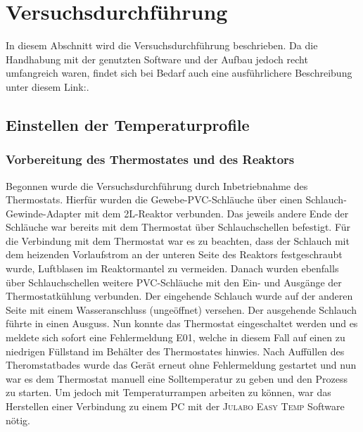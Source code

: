 \section{Versuchsdurchführung}
\label{sec:durchfuerung}
In diesem Abschnitt wird die Versuchsdurchführung beschrieben. Da die Handhabung mit der genutzten Software und der Aufbau jedoch recht umfangreich waren, findet sich bei Bedarf auch eine ausführlichere Beschreibung unter diesem Link:.
\subsection{Einstellen der Temperaturprofile}
\subsubsection*{Vorbereitung des Thermostates und des Reaktors}
Begonnen wurde die Versuchsdurchführung durch Inbetriebnahme des Thermostats. Hierfür wurden die Gewebe-PVC-Schläuche über einen Schlauch-Gewinde-Adapter mit dem 2L-Reaktor verbunden. Das jeweils andere Ende der Schläuche war bereits mit dem Thermostat über Schlauchschellen befestigt. Für die Verbindung mit dem Thermostat war es zu beachten, dass der Schlauch mit dem heizenden Vorlaufstrom an der unteren Seite des Reaktors festgeschraubt wurde, Luftblasen im Reaktormantel zu vermeiden. Danach wurden ebenfalls über Schlauchschellen weitere PVC-Schläuche mit den Ein- und Ausgänge der Thermostatkühlung verbunden. Der eingehende Schlauch wurde auf der anderen Seite mit einem Wasseranschluss (ungeöffnet) versehen. Der ausgehende Schlauch führte in einen Ausguss. Nun konnte das Thermostat eingeschaltet werden und es meldete sich sofort eine Fehlermeldung E01, welche in diesem Fall auf einen zu niedrigen Füllstand im Behälter des Thermostates hinwies. Nach Auffüllen des Theromstatbades wurde das Gerät erneut ohne Fehlermeldung gestartet und nun war es dem Thermostat manuell eine Solltemperatur zu geben und den Prozess zu starten. Um jedoch mit Temperaturrampen arbeiten zu können, war das Herstellen einer Verbindung zu einem PC mit der \textsc{Julabo Easy Temp} Software nötig.

